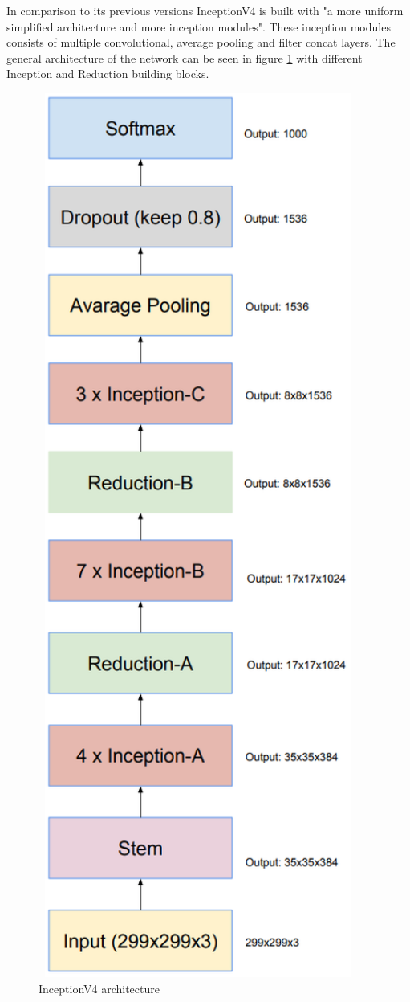 In comparison to its previous versions InceptionV4 is built with "a more uniform simplified architecture and more inception modules". These inception modules consists of multiple convolutional, average pooling and filter concat layers.
The general architecture of the network can be seen in figure \ref{fig:inceptionv4} with different Inception and Reduction building blocks. 
\begin{figure}[]
\centering
\includegraphics[angle=90,width=0.94\textwidth]{./Bilder/inceptionV4_architecture.png}
\caption{InceptionV4 architecture \cite{InceptionV4}}
\label{fig:inceptionv4}
\end{figure}
